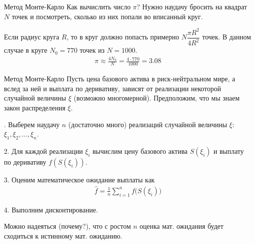 \documentclass{beamer}
\begin{document}
\begin{frame}{Метод Монте-Карло}
\justify
Как вычислить число $\pi$? Нужно наудачу бросить на квадрат $N$ точек и посмотреть, сколько из них попали во вписанный круг. 

\centering
{}
\justify
Если радиус круга $R$, то в круг должно попасть примерно $N\dfrac{\pi R^2}{4R^2}$ точек. В данном случае в круге $N_0=770$ точек из $N=1000$. 
\begin{align*}
\pi \approx \frac{4N_0}{N} = \frac{4 \cdot 770}{1000} = 3.08
\end{align*}
\end{frame}



\begin{frame}{Метод Монте-Карло}
\justify
Пусть цена базового актива в риск-нейтральном мире, а вслед за ней и выплата по деривативу, зависят от реализации некоторой случайной величины $\xi$ (возможно многомерной). Предположим, что мы знаем закон распределения $\xi$.

. Выберем наудачу $n$ (достаточно много) реализаций случайной величины $\xi$: $\xi_1, \xi_2, ..., \xi_n$.

2. Для каждой реализации $\xi_i$ вычислим цену базового актива $S(\xi_i)$ и выплату по деривативу $f(S(\xi_i))$.

3. Оценим математическое ожидание выплаты как 
\begin{align*}
\hat{f} = \frac{1}{n}\sum\limits_{i=1}^{n}f\Big(S(\xi_i)\Big)
\end{align*}

4. Выполним дисконтирование.

\justify
Можно надеяться (почему?), что с ростом $n$ оценка мат. ожидания будет сходиться к истинному мат. ожиданию.
\end{frame}
\end{document}
